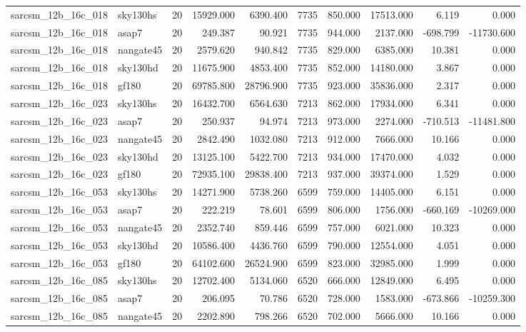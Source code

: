 \begin{tabular}{llrrrrrrrr}
sarcsm\_12b\_16c\_018 & sky130hs & 20 & 15929.000 & 6390.400 & 7735 & 850.000 & 17513.000 & 6.119 & 0.000 \\
sarcsm\_12b\_16c\_018 & asap7 & 20 & 249.387 & 90.921 & 7735 & 944.000 & 2137.000 & -698.799 & -11730.600 \\
sarcsm\_12b\_16c\_018 & nangate45 & 20 & 2579.620 & 940.842 & 7735 & 829.000 & 6385.000 & 10.381 & 0.000 \\
sarcsm\_12b\_16c\_018 & sky130hd & 20 & 11675.900 & 4853.400 & 7735 & 852.000 & 14180.000 & 3.867 & 0.000 \\
sarcsm\_12b\_16c\_018 & gf180 & 20 & 69785.800 & 28796.900 & 7735 & 923.000 & 35836.000 & 2.317 & 0.000 \\
sarcsm\_12b\_16c\_023 & sky130hs & 20 & 16432.700 & 6564.630 & 7213 & 862.000 & 17934.000 & 6.341 & 0.000 \\
sarcsm\_12b\_16c\_023 & asap7 & 20 & 250.937 & 94.974 & 7213 & 973.000 & 2274.000 & -710.513 & -11481.800 \\
sarcsm\_12b\_16c\_023 & nangate45 & 20 & 2842.490 & 1032.080 & 7213 & 912.000 & 7666.000 & 10.166 & 0.000 \\
sarcsm\_12b\_16c\_023 & sky130hd & 20 & 13125.100 & 5422.700 & 7213 & 934.000 & 17470.000 & 4.032 & 0.000 \\
sarcsm\_12b\_16c\_023 & gf180 & 20 & 72935.100 & 29838.400 & 7213 & 937.000 & 39374.000 & 1.529 & 0.000 \\
sarcsm\_12b\_16c\_053 & sky130hs & 20 & 14271.900 & 5738.260 & 6599 & 759.000 & 14405.000 & 6.151 & 0.000 \\
sarcsm\_12b\_16c\_053 & asap7 & 20 & 222.219 & 78.601 & 6599 & 806.000 & 1756.000 & -660.169 & -10269.000 \\
sarcsm\_12b\_16c\_053 & nangate45 & 20 & 2352.740 & 859.446 & 6599 & 757.000 & 6021.000 & 10.323 & 0.000 \\
sarcsm\_12b\_16c\_053 & sky130hd & 20 & 10586.400 & 4436.760 & 6599 & 790.000 & 12554.000 & 4.051 & 0.000 \\
sarcsm\_12b\_16c\_053 & gf180 & 20 & 64102.600 & 26524.900 & 6599 & 823.000 & 32985.000 & 1.999 & 0.000 \\
sarcsm\_12b\_16c\_085 & sky130hs & 20 & 12702.400 & 5134.060 & 6520 & 666.000 & 12849.000 & 6.495 & 0.000 \\
sarcsm\_12b\_16c\_085 & asap7 & 20 & 206.095 & 70.786 & 6520 & 728.000 & 1583.000 & -673.866 & -10259.300 \\
sarcsm\_12b\_16c\_085 & nangate45 & 20 & 2202.890 & 798.266 & 6520 & 702.000 & 5666.000 & 10.166 & 0.000 \\

\end{tabular}
